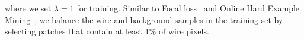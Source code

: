


where we 
set $\lambda = 1$ for training. 
Similar to Focal loss~\cite{focal} and Online Hard Example Mining~\cite{ohem}, we balance the wire and background samples in the training set by selecting patches that contain at least 1\% of wire pixels. %

